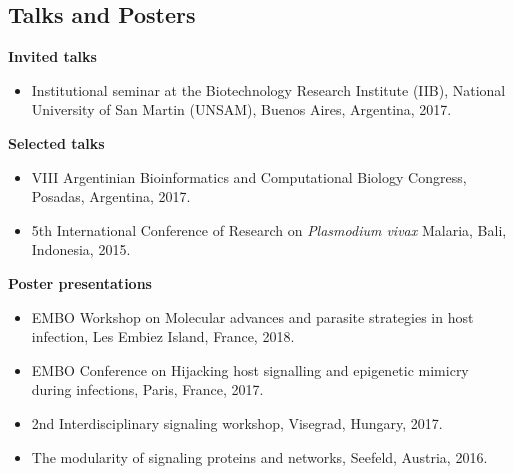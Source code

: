 \documentclass[11pt,a4paper,sans]{moderncv} %
\begin{document}
\begin{itemize}
\section{Talks and Posters}
\vspace{-.1cm}
\textbf{Invited talks}
\begin{itemize}
\item Institutional seminar at the Biotechnology Research Institute (IIB), National University of San Martin (UNSAM), Buenos Aires, Argentina, 2017.
\end{itemize}
\vspace{.1cm}
\textbf{Selected talks}
\begin{itemize}
\item VIII Argentinian Bioinformatics and Computational Biology Congress, Posadas, Argentina, 2017.
\item 5th International Conference of Research on \textit{Plasmodium vivax} Malaria, Bali, Indonesia, 2015.
\end{itemize}
\vspace{.1cm}
\textbf{Poster presentations}
\begin{itemize}
\item EMBO Workshop on Molecular advances and parasite strategies in host infection, Les Embiez Island, France, 2018.
\item EMBO Conference on Hijacking host signalling and epigenetic mimicry during infections, Paris, France, 2017.
\item 2nd Interdisciplinary signaling workshop, Visegrad, Hungary, 2017.
\item The modularity of signaling proteins and networks, Seefeld, Austria, 2016.
\end{itemize}

\vspace{-.2cm}

\end{itemize}
\end{document}
